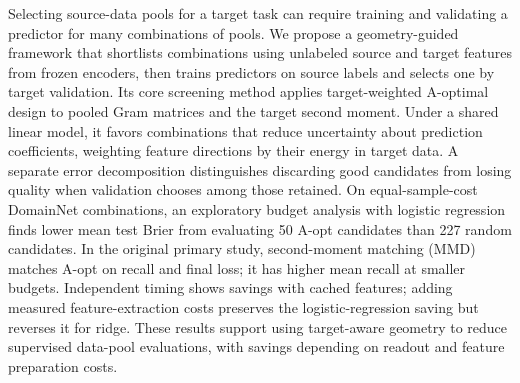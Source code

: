 Selecting source-data pools for a target task can require training and validating a predictor for many combinations of pools. We propose a geometry-guided framework that shortlists combinations using unlabeled source and target features from frozen encoders, then trains predictors on source labels and selects one by target validation. Its core screening method applies target-weighted A-optimal design to pooled Gram matrices and the target second moment. Under a shared linear model, it favors combinations that reduce uncertainty about prediction coefficients, weighting feature directions by their energy in target data. A separate error decomposition distinguishes discarding good candidates from losing quality when validation chooses among those retained. On equal-sample-cost DomainNet combinations, an exploratory budget analysis with logistic regression finds lower mean test Brier from evaluating 50 A-opt candidates than 227 random candidates. In the original primary study, second-moment matching (MMD) matches A-opt on recall and final loss; it has higher mean recall at smaller budgets. Independent timing shows savings with cached features; adding measured feature-extraction costs preserves the logistic-regression saving but reverses it for ridge. These results support using target-aware geometry to reduce supervised data-pool evaluations, with savings depending on readout and feature preparation costs.
